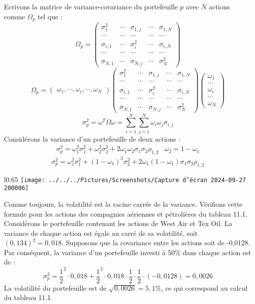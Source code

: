 \documentclass[a4paper, 12pt]{report}
\begin{document}
Ecrivons la matrice de variance-covariance du portefeuille $p$ avec $N$ actions comme $\Omega_p$ tel que :
$$
\Omega_p=\begin{pmatrix}
	\sigma^2_1& \cdots & \sigma_{1,j} & \cdots & \sigma_{1,N} \\
	\cdots& \cdots & \cdots & \cdots & \cdots \\
	\sigma_{i,1} & \cdots & \sigma^2_i & \cdots & \sigma_{i,N} \\
	\cdots & \cdots & \cdots  & \cdots & \cdots  \\
	\sigma_{N,1} & \cdots & \sigma_{N,j} & \cdots & \sigma^2_N
\end{pmatrix}
$$
$$
\Omega_p=\begin{pmatrix}
	\omega_1,\cdots,\omega_i,\cdots,\omega_N
\end{pmatrix}\begin{pmatrix}
	\sigma^2_1& \cdots & \sigma_{1,j} & \cdots & \sigma_{1,N} \\
	\cdots& \cdots & \cdots & \cdots & \cdots \\
	\sigma_{i,1} & \cdots & \sigma^2_i & \cdots & \sigma_{i,N} \\
	\cdots & \cdots & \cdots  & \cdots & \cdots  \\
	\sigma_{N,1} & \cdots & \sigma_{N,j} & \cdots & \sigma^2_N
\end{pmatrix}\begin{pmatrix}
	\omega_1 \\
	\cdots\\
	\omega_i \\
	\cdots \\
	\omega_N
\end{pmatrix}
$$
$$
\sigma^2_p=\omega^T\Omega\omega=\sum_{i=1}^{N}\sum_{j=1}^{N}\omega_i\omega_j\sigma_{i,j}
$$
Considérons la variance d'un portefeuille de deux actions :
$$
\begin{matrix}
	\sigma_p^2=\omega_1^2\sigma_1^2+\omega_2^2\sigma_2^2+2\omega_1\omega_2\sigma_1\sigma_2\rho_{1,2}& \omega_2=1-\omega_1
\end{matrix}
$$
$$
\sigma_p^2=\omega_1^2\sigma_1^2+(1-\omega_1)^2\sigma_2^2+2\omega_1(1-\omega_1)\sigma_1\sigma_2\rho_{1,2}
$$
\newpage
\begin{wrapfigure}{l}{0.65\textwidth}
	\centering
	\texttt{[image: ../../../Pictures/Screenshots/Capture d'écran 2024-09-27 200006]}
\end{wrapfigure}
Comme toujours, la volatilité est la racine carrée de la variance. Vérifions cette formule pour les actions des compagnies aériennes et pétrolières du tableau 11.1. Considérons le portefeuille contenant les actions de West Air et Tex Oil. La variance de chaque action est égale au carré de sa volatilité, soit $(0,134)^2 = 0,018$. Supposons que la covariance entre les actions soit de -0,0128. Par conséquent, la variance d'un portefeuille investi à 50\% dans chaque action est de :
$$
\sigma_p^2=\frac{1}{2}^2\cdot0,018+\frac{1}{2}^2\cdot0,018\cdot\frac{1}{2}\cdot\frac{1}{2}\cdot(-0,0128)=0,0026
$$
La volatilité du portefeuille est de $\sqrt{0,0026} = 5,1\%$, ce qui correspond au calcul du tableau 11.1.
\end{document}
